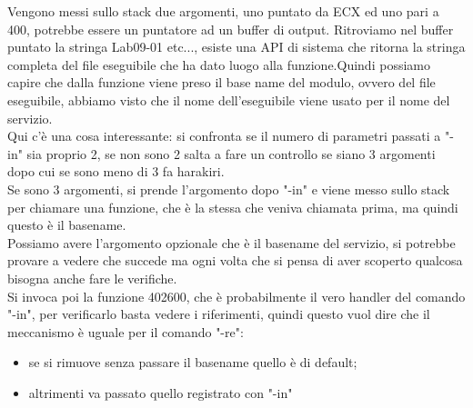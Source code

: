 \documentclass[12pt, oneside]{extbook}
\begin{document}
Vengono messi sullo stack due argomenti, uno puntato da ECX ed uno pari a 400, potrebbe essere un puntatore ad un buffer di output. Ritroviamo nel buffer puntato la stringa Lab09-01 etc..., esiste una API di sistema che ritorna la stringa completa del file eseguibile che ha dato luogo alla funzione.Quindi possiamo capire che dalla funzione viene preso il base name del modulo, ovvero del file eseguibile, abbiamo visto che il nome dell'eseguibile viene usato per il nome del servizio.\\Qui c'è una cosa interessante: si confronta se il numero di parametri passati a "-in" sia proprio 2, se non sono 2 salta a fare un controllo se siano 3 argomenti dopo cui se sono meno di 3 fa harakiri.\\Se sono 3 argomenti, si prende l'argomento dopo "-in" e viene messo sullo stack per chiamare una funzione, che è la stessa che veniva chiamata prima, ma quindi questo è il basename.\\Possiamo avere l'argomento opzionale che è il basename del servizio, si potrebbe provare a vedere che succede ma ogni volta che si pensa di aver scoperto qualcosa bisogna anche fare le verifiche.\\Si invoca poi la funzione 402600, che è probabilmente il vero handler del comando "-in", per  verificarlo basta vedere i riferimenti, quindi questo vuol dire che il meccanismo è uguale per il comando "-re":
\begin{itemize}
\item se si rimuove senza passare il basename quello è di default;
\item altrimenti va passato quello registrato con "-in"
\end{itemize}
\end{document}
